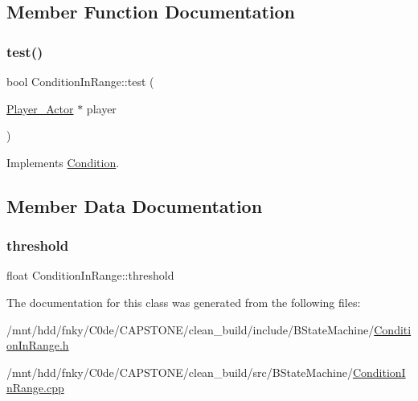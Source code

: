 \subsection{Member Function Documentation}
\mbox{\label{classConditionInRange_a64cc1a7816537a2d8e29972199b3e8f9}} 
\subsubsection{\texorpdfstring{test()}{test()}}
{\footnotesize\ttfamily bool Condition\+In\+Range\+::test (\begin{DoxyParamCaption}\item[{\hyperlink{classPlayer__Actor}{Player\+\_\+\+Actor} $\ast$}]{player }\end{DoxyParamCaption})\hspace{0.3cm}{\ttfamily [virtual]}}



Implements \hyperlink{classCondition_a4826569fb7c6f920884abb7583a081b6}{Condition}.



\subsection{Member Data Documentation}
\mbox{\label{classConditionInRange_a5c54f7654bd6702a93b5166ef657f580}} 
\subsubsection{\texorpdfstring{threshold}{threshold}}
{\footnotesize\ttfamily float Condition\+In\+Range\+::threshold\hspace{0.3cm}{\ttfamily [private]}}



The documentation for this class was generated from the following files\+:\begin{DoxyCompactItemize}
\item 
/mnt/hdd/fnky/\+C0de/\+C\+A\+P\+S\+T\+O\+N\+E/clean\+\_\+build/include/\+B\+State\+Machine/\hyperlink{ConditionInRange_8h}{Condition\+In\+Range.\+h}\item 
/mnt/hdd/fnky/\+C0de/\+C\+A\+P\+S\+T\+O\+N\+E/clean\+\_\+build/src/\+B\+State\+Machine/\hyperlink{ConditionInRange_8cpp}{Condition\+In\+Range.\+cpp}\end{DoxyCompactItemize}
